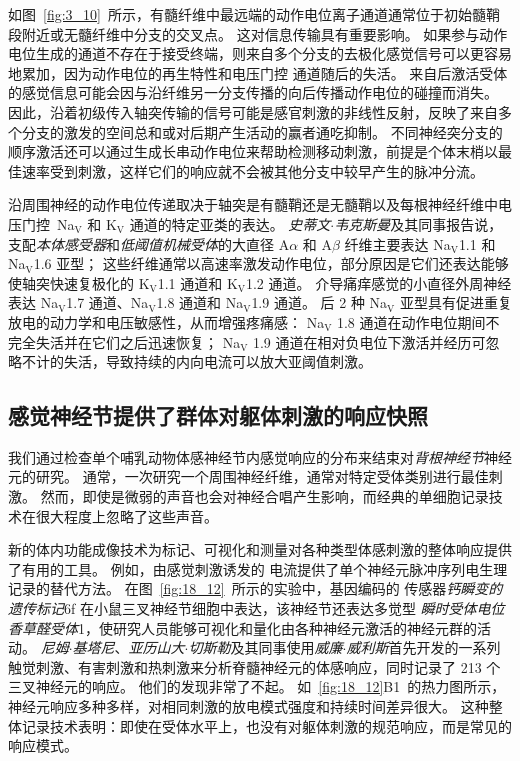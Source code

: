 如图~\ref{fig:3_10}~所示，有髓纤维中最远端的动作电位离子通道通常位于初始髓鞘段附近或无髓纤维中分支的交叉点。
这对信息传输具有重要影响。
如果参与动作电位生成的通道不存在于接受终端，则来自多个分支的去极化感觉信号可以更容易地累加，因为动作电位的再生特性和电压门控  通道随后的失活。
来自后激活受体的感觉信息可能会因与沿纤维另一分支传播的向后传播动作电位的碰撞而消失。
因此，沿着初级传入轴突传输的信号可能是感官刺激的非线性反射，反映了来自多个分支的激发的空间总和或对后期产生活动的赢者通吃抑制。
不同神经突分支的顺序激活还可以通过生成长串动作电位来帮助检测移动刺激，前提是个体末梢以最佳速率受到刺激，这样它们的响应就不会被其他分支中较早产生的脉冲分流。



沿周围神经的动作电位传递取决于轴突是有髓鞘还是无髓鞘以及每根神经纤维中电压门控~Na$_\text{V}$ 和 K$_\text{V}$ 通道的特定亚类的表达。
\textit{史蒂文$\cdot$韦克斯曼}及其同事报告说，支配\textit{本体感受器}和\textit{低阈值机械受体}的大直径 A$\alpha$ 和 A$\beta$ 纤维主要表达 Na$_\text{V}$1.1 和 Na$_\text{V}$1.6 亚型；
这些纤维通常以高速率激发动作电位，部分原因是它们还表达能够使轴突快速复极化的 K$_\text{V}$1.1 通道和 K$_\text{V}$1.2 通道。
介导痛痒感觉的小直径外周神经表达 Na$_\text{V}$1.7 通道、Na$_\text{V}$1.8 通道和 Na$_\text{V}$1.9 通道。
后 2 种 Na$_\text{V}$ 亚型具有促进重复放电的动力学和电压敏感性，从而增强疼痛感：
Na$_\text{V}$ 1.8 通道在动作电位期间不完全失活并在它们之后迅速恢复； 
Na$_\text{V}$ 1.9 通道在相对负电位下激活并经历可忽略不计的失活，导致持续的内向电流可以放大亚阈值刺激。



\subsection{感觉神经节提供了群体对躯体刺激的响应快照}

我们通过检查单个哺乳动物体感神经节内感觉响应的分布来结束对\textit{背根神经节}神经元的研究。
通常，一次研究一个周围神经纤维，通常对特定受体类别进行最佳刺激。
然而，即使是微弱的声音也会对神经合唱产生影响，而经典的单细胞记录技术在很大程度上忽略了这些声音。


新的体内功能成像技术为标记、可视化和测量对各种类型体感刺激的整体响应提供了有用的工具。
例如，由感觉刺激诱发的  电流提供了单个神经元脉冲序列电生理记录的替代方法。
在图~\ref{fig:18_12}~所示的实验中，基因编码的  传感器\textit{钙瞬变的遗传标记}6f 在小鼠三叉神经节细胞中表达，该神经节还表达多觉型 \textit{瞬时受体电位香草醛受体}1，使研究人员能够可视化和量化由各种神经元激活的神经元群的活动。
\textit{尼姆$\cdot$基塔尼}、\textit{亚历山大$\cdot$切斯勒}及其同事使用\textit{威廉$\cdot$威利斯}首先开发的一系列触觉刺激、有害刺激和热刺激来分析脊髓神经元的体感响应，同时记录了 213 个三叉神经元的响应\cite{2017Specialized}。
他们的发现非常了不起。
如~\ref{fig:18_12}B1~的热力图所示，神经元响应多种多样，对相同刺激的放电模式强度和持续时间差异很大。
这种整体记录技术表明：即使在受体水平上，也没有对躯体刺激的规范响应，而是常见的响应模式。

